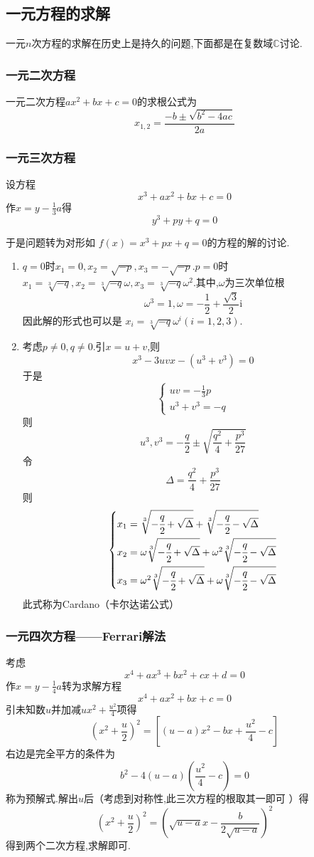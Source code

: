 \subsection{一元方程的求解}
一元$n$次方程的求解在历史上是持久的问题,下面都是在复数域$\mathbb{C}$讨论.
\subsubsection{一元二次方程}
一元二次方程$ax^2+bx+c=0$的求根公式为
\[
x_{1,2}=\frac{
    -b\pm \sqrt{b^2-4ac}
}{2a}
\]
\subsubsection{一元三次方程}
设方程
\[
x^3+ax^2+bx+c=0
\]
作$\displaystyle
x=y-\frac{1}{3}a$得
\[
y^3+py+q=0
\]

于是问题转为对形如
$f\left(x\right)=x^3+px+q=0$的方程的解的讨论.

\begin{enumerate}[label={\textup{(\arabic*)}}]
    \item $q=0$时$x_1=0,x_2=\sqrt{-p},x_3=-\sqrt{-p}.p=0$时$x_1=\sqrt[3]{-q},x_2=\sqrt[3]{-q}\omega,x_3=\sqrt[3]{-q}\omega^2.$其中,$\omega$为三次单位根
    \[
    \omega ^3=1,\omega = -\frac{1}{2}+\frac{\sqrt{3}}{2}\mathrm{i}
    \]
    因此解的形式也可以是
    $x_i=\sqrt[3]{-q}\omega^i\left(i=1,2,3
    \right)$.
    \item 考虑$p\neq 0,q\neq 0$.引$x=u+v$,则
    \[
    x^3-3uvx-\left(u^3+v^3\right)=0
    \]
    于是\[
    \begin{cases*}
    uv=-\frac{1}{3}p\\
    u^3+v^3=-q
    \end{cases*}
    \]
    则\[
    u^3,v^3=-\frac{q}{2}\pm \sqrt{\frac{q^2}{4}+\frac{p^3}{27}}
    \]
    令\[
    \Delta = \frac{q^2}{4}+\frac{p^3}{27}
    \]
    则
    \[
    \begin{cases*}
    x_1=\sqrt[3]{-\cfrac{q}{2}+\sqrt{\Delta}}+\sqrt[3]{-\cfrac{q}{2}-\sqrt{\Delta}}\\
    x_2=\omega \sqrt[3]{-\cfrac{q}{2}+\sqrt{\Delta}}+\omega^2\sqrt[3]{-\cfrac{q}{2}-\sqrt{\Delta}}\\
    x_3=\omega^2 \sqrt[3]{-\cfrac{q}{2}+\sqrt{\Delta}}+\omega\sqrt[3]{-\cfrac{q}{2}-\sqrt{\Delta}}
    \end{cases*}
    \]
    此式称为\textup{Cardano}（卡尔达诺公式）
\end{enumerate}
\subsubsection{一元四次方程——Ferrari解法}
考虑\[
x^4+ax^3+bx^2+cx+d=0
\]
作$\displaystyle
x=y-\frac{1}{4}a$转为求解方程
\[
x^4+ax^2+bx+c=0
\]
引未知数$u$并加减$\displaystyle
ux^2+\frac{u^2}{4}$项得
\[
\left(x^2+\frac{u}{2}\right)^2=\left[
    \left(u-a\right)x^2-bx+\frac{u^2}{4}-c
\right]
\]
右边是完全平方的条件为
\[
b^2-4\left(u-a\right)\left(\frac{u^2}{4}-c\right)=0
\]
称为预解式.解出$u$后（考虑到对称性,此三次方程的根取其一即可
）得\[
\left(x^2+\frac{u}{2}\right)^2=
\left(
    \sqrt{u-a}x-\frac{b}{2\sqrt{u-a}}
\right)^2
\]
得到两个二次方程,求解即可.

